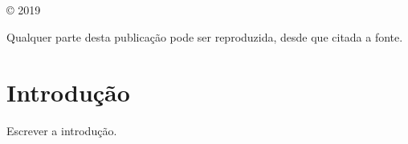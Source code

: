 \documentclass[
	12pt,				%
	openright,			%
	twoside,			%
	a4paper,			%
	english,			%
	french,				%
	brazil,				%
	sumario=tradicional
]{abntex2}
\numberwithin{example}{chapter}
\numberwithin{remark}{chapter}
\numberwithin{definition}{chapter}
\numberwithin{figure}{chapter}
\newcommand{\todo}[1]{
	{\color{red}#1}
}
\begin{document}
\frenchspacing

\frontmatter


\begin{titlingpage}
\phantom{xxx}
\vspace{0.5cm}
\huge
\raggedright
\imprimirautor\\
\vspace{2.5cm}
\huge 
{\raggedleft
\textit{\textcolor{blue}{\imprimirtitulo}}\\[1cm]
}
\centering 
\vfill
\Large
\imprimirinstituicao
\end{titlingpage}

\begin{titlingpage}

\phantom{xxx}
\vspace{0.5cm}
\huge
\raggedright
\imprimirautor\\
\vspace{2.5cm}
\huge 
{\raggedleft
\textit{\textcolor{blue}{\imprimirtitulo}}\\[1cm]
}
\centering 
\vfill
\Large
\imprimirinstituicao

\clearpage
\ABNTEXfontereduzida
© 2019 \imprimirautor

Qualquer parte desta publicação pode ser reproduzida, desde que citada a fonte.
\vspace*{\fill}

\end{titlingpage}

\listoffigures*
\cleardoublepage

\listoftables*
\cleardoublepage

\tableofcontents*
\cleardoublepage


\mainmatter

\chapter*[Introdução]{Introdução}

\todo{Escrever a introdução.}
\end{document}
